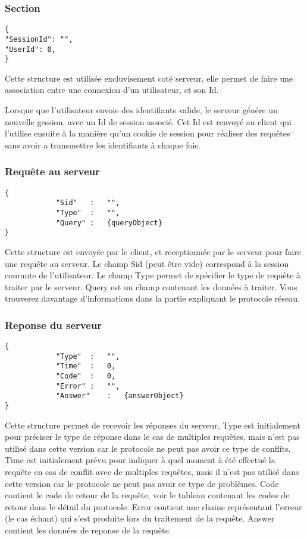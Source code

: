 \subsubsection{Section}
\begin{lstlisting}
{
"SessionId": "",
"UserId": 0,
}
\end{lstlisting}
Cette structure est utilisée excluvisement coté serveur, elle permet de faire une association entre une connexion d'un utilisateur, et son Id.\par
Lorsque que l'utilisateur envoie des identifiants valide, le serveur génére un nouvelle gession, avec un Id de session associé. Cet Id est renvoyé au client qui l'utilise ensuite à la manière qu'un cookie de session pour réaliser des requêtes sans avoir a transmettre les identifiants à chaque fois.

\subsubsection{Requête au serveur}
\begin{lstlisting}
{
			"Sid"	:	"",
			"Type"	:	"",
			"Query"	:	{queryObject}
}
\end{lstlisting}

Cette structure est envoyée par le client, et receptionnée par le serveur pour faire une requête au serveur. Le champ \og Sid \fg (peut être vide) correspond à la session courante de l'utilisateur.
Le champ \og Type \fg permet de spécifier le type de requête à traiter par le serveur.
\of Query \fg est un champ contenant les données à traiter. Vous trouverez davantage d'informations dans la partie expliquant le protocole réseau.

\subsubsection{Reponse du serveur}
\begin{lstlisting}
{
			"Type"	:	"",
			"Time"	:	0,
			"Code"	:	0,
			"Error"	:	"",
			"Answer"	:	{answerObject}
}
\end{lstlisting}
Cette structure permet de recevoir les réponses du serveur, \og Type \fg est initialement pour préciser le type de réponse dans le cas de multiples requêtes, mais n'est pas utilisé dans cette version car le protocole ne peut pas avoir ce type de conflits. \og Time \fg est initialement prévu pour indiquer à quel moment à été effectué la requête en cas de conflit avec de multiples requêtes, mais il n'est pas utilisé dans cette version car le protocole ne peut pas avoir ce type de problèmes. \og Code \fg contient le code de retour de la requête, voir le tableau contenant les codes de retour dans le détail du protocole. \og Error \fg contient une chaine représentant l'erreur (le cas échant) qui s'est produite lors du traitement de la requête. \og Answer \fg contient les données de reponse de la requête.

% 

